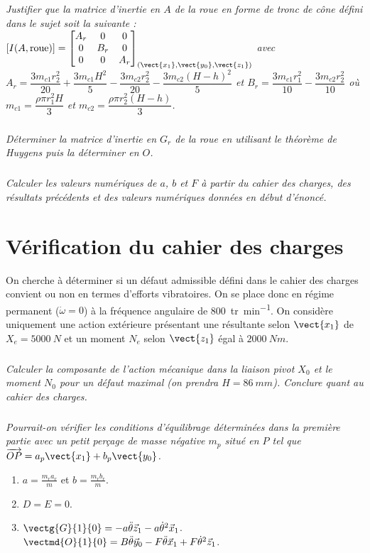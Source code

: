 \begin{multicols}{2}
\subparagraph{}
\textit{Justifier que la matrice d'inertie en $A$ de la roue en forme de tronc de cône défini dans le sujet soit la suivante : $\left[I(A,\text{roue})\right]=\begin{bmatrix}
A_r & 0 & 0 \\ 
0 & B_r & 0 \\ 
0 & 0 & A_r
\end{bmatrix}_{(\vect{x_1},\vect{y_0},\vect{z_1})}
$
avec $A_r=\dfrac{3 m_{c1} r_2^2}{20}+\dfrac{3 m_{c1} H^2}{5} -\dfrac{3 m_{c2} r_2^2}{20}-\dfrac{3 m_{c2} (H-h)^2}{5} $ et $B_r=\dfrac{3 m_{c1} r_1^2}{10}-\dfrac{3 m_{c2} r_2^2}{10}$ où $m_{c1}=\dfrac{\rho \pi r_1^2 H}{3}$ et $m_{c2}=\dfrac{\rho \pi r_2^2 (H-h)}{3}$.}


\subparagraph{}
\textit{Déterminer la matrice d'inertie en $G_r$ de la roue en utilisant le théorème de Huygens puis la déterminer en $O$.}

\subparagraph{}
\textit{Calculer les valeurs numériques de $a$, $b$ et $F$ à partir du cahier des charges, des résultats précédents et des valeurs numériques données en début d'énoncé.}


\section*{Vérification du cahier des charges}

On cherche à déterminer si un défaut admissible défini dans le cahier des charges convient ou non en termes d'efforts vibratoires.
On se place donc en régime permanent ($\dot{\omega}=0$) à la fréquence angulaire de \SI{800}{tr.min^{-1}}. On considère uniquement une action extérieure présentant une résultante selon $\vect{x_1}$ de $X_e=\SI{5000}{N}$ et un moment $N_e$ selon $\vect{z_1}$ égal à $\SI{2000}{Nm}$.


\subparagraph{}
\textit{Calculer la composante de l'action mécanique dans la liaison pivot $X_0$ et le moment $N_0$ pour un défaut maximal (on prendra $H=\SI{86}{mm}$). Conclure quant au cahier des charges.}


\subparagraph{}
\textit{Pourrait-on vérifier les conditions d'équilibrage déterminées dans la première partie avec un petit perçage de masse négative $m_p$ situé en $P$ tel que $\overrightarrow{OP} = a_p \vect{x_1} + b_p \vect{y_0}$.}


\vspace{2cm}

\footnotesize
\begin{enumerate}
\item $a=\frac{m_r a_r}{m}$ et $b=\frac{m_r b_r}{m}$.
\item $D=E=0$.
\item $\vectg{G}{1}{0}=-a\ddot{\theta} \vec{z}_1-a\dot{\theta}^2\vec{x}_1$. $\vectmd{O}{1}{0}=B \ddot{\theta}\vec{y}_0 - F \ddot{\theta} \vec{x}_1 + F \dot{\theta}^2 \vec{z}_1$.



\end{enumerate}
\end{multicols}
